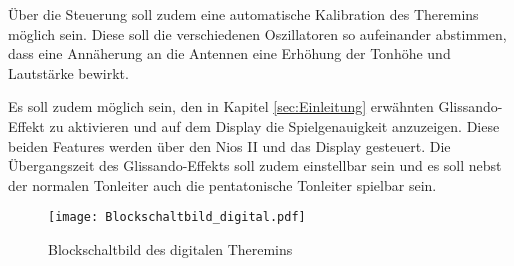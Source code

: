 Über die Steuerung soll zudem eine automatische Kalibration des Theremins möglich sein. Diese soll die verschiedenen Oszillatoren so aufeinander abstimmen, dass eine Annäherung an die Antennen eine Erhöhung der Tonhöhe und Lautstärke bewirkt.

Es soll zudem möglich sein, den in Kapitel \ref{sec:Einleitung} erwähnten Glissando-Effekt zu aktivieren und auf dem Display die Spielgenauigkeit anzuzeigen. Diese beiden Features werden über den Nios II und das Display gesteuert. Die Übergangszeit des Glissando-Effekts soll zudem einstellbar sein und es soll nebst der normalen Tonleiter auch die pentatonische Tonleiter spielbar sein.

\begin{figure}[h]
	\centering
	\texttt{[image: Blockschaltbild\_digital.pdf]}
	\caption{Blockschaltbild des digitalen Theremins}
	\label{img:Blockschaltbild_digital}
\end{figure}